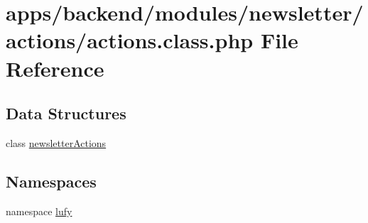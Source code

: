 \hypertarget{backend_2modules_2newsletter_2actions_2actions_8class_8php}{\section{apps/backend/modules/newsletter/actions/actions.class.\-php File Reference}
\label{backend_2modules_2newsletter_2actions_2actions_8class_8php}
}
\subsection*{Data Structures}
\begin{DoxyCompactItemize}
\item 
class \hyperlink{classnewsletter_actions}{newsletter\-Actions}
\end{DoxyCompactItemize}
\subsection*{Namespaces}
\begin{DoxyCompactItemize}
\item 
namespace \hyperlink{namespacelufy}{lufy}
\end{DoxyCompactItemize}
